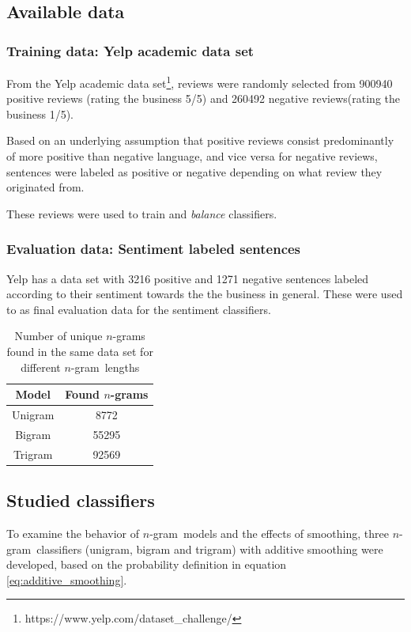 \documentclass[a4paper,11pt]{kth-mag}
\newcommand{\ngram}{$n$-gram}
\begin{document}
\subsection{Available data}

\subsubsection{Training data: Yelp academic data set}
From the Yelp academic data set\footnote{https://www.yelp.com/dataset\_challenge/},
reviews were randomly selected from 900940 positive reviews (rating the business 5/5)
and 260492 negative reviews(rating the business 1/5).%

Based on an underlying assumption that positive reviews consist predominantly of more
positive than negative language, and vice versa for negative reviews,
sentences were labeled as positive or negative depending on what review they originated from.

These reviews were used to train and \emph{balance} classifiers.

\subsubsection{Evaluation data: Sentiment labeled sentences}
Yelp has a data set with 3216 positive and 1271 negative sentences labeled
according to their sentiment towards the the business in general.
These were used to as final evaluation data for the sentiment classifiers.

\vspace{2cm}
\begin{table}[h]
  \centering
  \begin{tabular}{| c | c |}
    \hline
    \textbf{Model} & \textbf{Found \ngram s}\\ \hline
    Unigram&8772\\
    Bigram&55295\\
    Trigram&92569\\
    \hline
  \end{tabular}
  \caption{Number of unique \ngram s found in the same data set for different \ngram~lengths}
  \label{tab:found_ngrams}
\end{table}

\pagebreak


\subsection{Studied classifiers}
To examine the behavior of \ngram~models and the effects of smoothing,
three \ngram~classifiers (unigram, bigram and trigram) with additive smoothing
were developed, based on the probability definition in equation \ref{eq:additive_smoothing}.
\end{document}

